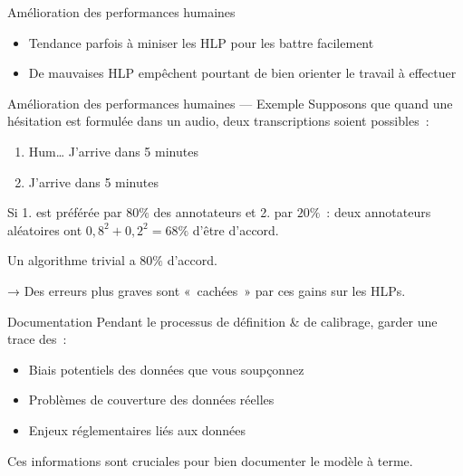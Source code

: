\begin{frame}{Amélioration des performances humaines}
  \begin{itemize}
    \item Tendance parfois à miniser les HLP pour les battre facilement
    \item De mauvaises HLP empêchent pourtant de bien orienter le travail à effectuer
  \end{itemize}
\end{frame}

\begin{frame}{Amélioration des performances humaines — Exemple}
  Supposons que quand une hésitation est formulée dans un audio, deux transcriptions soient possibles~:
  \begin{enumerate}
    \item Hum… J'arrive dans 5 minutes
    \item J'arrive dans 5 minutes
  \end{enumerate}
  Si 1. est préférée par $80\%$ des annotateurs et 2. par $20\%$~: deux annotateurs aléatoires ont $0,8^2 + 0,2^2 = 68\%$ d'être d'accord.

  Un algorithme trivial a $80\%$ d'accord.

  → Des erreurs plus graves sont « cachées » par ces gains sur les HLPs.
\end{frame}

\begin{frame}{Documentation}
  Pendant le processus de définition \& de calibrage, garder une trace des~:

  \begin{itemize}
    \item Biais potentiels des données que vous soupçonnez
    \item Problèmes de couverture des données réelles
    \item Enjeux réglementaires liés aux données
  \end{itemize}

  Ces informations sont cruciales pour bien documenter le modèle à terme.
\end{frame}
